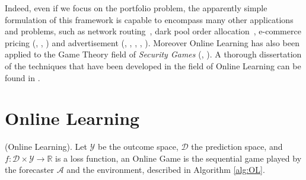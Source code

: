 Indeed, even if we focus on the portfolio problem, the apparently simple formulation of this framework is capable to encompass many other applications and problems, such as network routing~\cite{belmega2018online}, dark pool order allocation~\cite{agarwal2010optimal}, e-commerce pricing (\cite{trovo2015multi}, \cite{trovo2018improving}, \cite{paladino2017unimodal}) and advertisement (\cite{gasparini2018targeting}, \cite{nuara2018combinatorial}, \cite{nuara2020online}, \cite{nuara2019dealing}, \cite{gatti2015truthful}).
Moreover Online Learning has also been applied to the Game Theory field of \emph{Security Games} (\cite{jiang2013game}, \cite{bisi2017regret}).
A thorough dissertation of the techniques that have been developed in the field of Online Learning can be found in \cite{cesa2006prediction}.

\section{Online Learning}
\label{sec:OnlineLearning}


\begin{definition}(Online Learning).\label{def:OGP}
    Let $\mathcal Y$ be the outcome space, $\mathcal D$ the prediction space, and $f:\mathcal D\times\mathcal Y\to \mathbb R$ is a loss function, an Online Game is the sequential game played by the forecaster $\mathcal A$ and the environment, described in Algorithm \ref{alg:OL}.
\end{definition}

